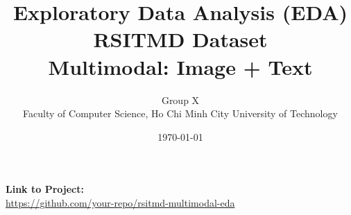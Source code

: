 \documentclass[12pt,a4paper]{article}
\title{
    \textbf{Exploratory Data Analysis (EDA)}\\
    \textbf{RSITMD Dataset}\\
    \vspace{0.5em}
    \large{Multimodal: Image + Text}
}
\author{
    Group X\\
    \vspace{0.5em}
    \small{Faculty of Computer Science, Ho Chi Minh City University of Technology}
}
\date{\today}
\begin{document}
\maketitle
\thispagestyle{empty}
\vspace{2em}

\begin{center}
    \textbf{Link to Project:}\\
    \url{https://github.com/your-repo/rsitmd-multimodal-eda}
\end{center}

\newpage

\tableofcontents
\newpage


\newpage

\newpage




\end{document}
